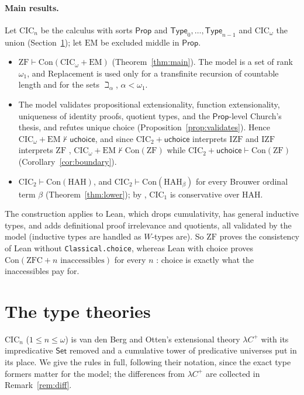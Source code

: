 \documentclass[10pt]{article}
\newcommand{\Prop}{\mathsf{Prop}}
\newcommand{\Type}{\mathsf{Type}}
\newcommand{\Set}{\mathsf{Set}}
\newcommand{\CIC}{\mathrm{CIC}}
\newcommand{\ZF}{\mathrm{ZF}}
\newcommand{\ZFC}{\mathrm{ZFC}}
\newcommand{\IZF}{\mathrm{IZF}}
\newcommand{\HAH}{\mathrm{HAH}}
\newcommand{\EM}{\mathrm{EM}}
\newcommand{\Con}{\mathrm{Con}}
\newcommand{\uchoice}{\mathsf{uchoice}}
\begin{document}
\paragraph{Main results.}
Let $\CIC_n$ be the calculus with sorts $\Prop$ and $\Type_0,\dots,\Type_{n-1}$
and $\CIC_\omega$ the union (Section~\ref{sec:theories}); let $\EM$ be
excluded middle in $\Prop$.
\begin{itemize}
\item $\ZF\vdash\Con(\CIC_\omega+\EM)$ (Theorem~\ref{thm:main}). The model is
  a set of rank $\omega_1$, and Replacement is used only for a transfinite
  recursion of countable length and for the sets $\beth_\alpha$,
  $\alpha<\omega_1$.
\item The model validates propositional extensionality, function
  extensionality, uniqueness of identity proofs, quotient types, and the
  $\Prop$-level Church's thesis, and refutes unique choice
  (Proposition~\ref{prop:validates}). Hence $\CIC_\omega+\EM\nvdash\uchoice$,
  and since $\CIC_2+\uchoice$ interprets $\IZF$ \cite{barras10} and
  $\IZF$ interprets $\ZF$ \cite{friedman73},
  $\CIC_\omega+\EM\nvdash\Con(\ZF)$ while $\CIC_2+\uchoice\vdash\Con(\ZF)$
  (Corollary~\ref{cor:boundary}).
\item $\CIC_2\vdash\Con(\HAH)$, and $\CIC_2\vdash\Con(\HAH_\beta)$ for every
  Brouwer ordinal term $\beta$ (Theorem~\ref{thm:lower}); by
  \cite{vdbergotten23}, $\CIC_1$ is conservative over $\HAH$.
\end{itemize}
The construction applies to Lean, which drops cumulativity, has general
inductive types, and adds definitional proof irrelevance and quotients, all
validated by the model (inductive types are handled as $W$-types are). So
$\ZF$ proves the consistency of Lean without \texttt{Classical.choice},
whereas Lean with choice proves $\Con(\ZFC+n\text{ inaccessibles})$ for every
$n$ \cite{carneiro19}: choice is exactly what the inaccessibles pay for.

\section{The type theories}\label{sec:theories}

$\CIC_n$ ($1\le n\le\omega$) is van den Berg and Otten's extensional theory
$\lambda C^+$ \cite[App.~A]{vdbergotten23} with its impredicative $\Set$
removed and a cumulative tower of predicative universes put in its place.
We give the rules in full, following their notation, since the exact type
formers matter for the model; the differences from $\lambda C^+$ are
collected in Remark~\ref{rem:diff}.
\end{document}
